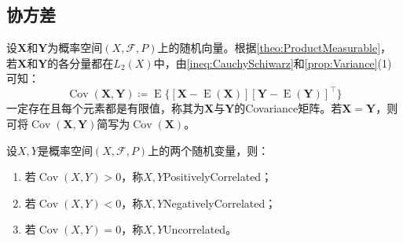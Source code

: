 \subsection{协方差}
\begin{definition}
	设$\mathbf{X}$和$\mathbf{Y}$为概率空间$(X,\mathscr{F},P)$上的随机向量。根据\cref{theo:ProductMeasurable}，若$\mathbf{X}$和$\mathbf{Y}$的各分量都在$L_2(X)$中，由\cref{ineq:CauchySchiwarz}和\cref{prop:Variance}(1)可知：
	\begin{equation*}
		\operatorname{Cov}(\mathbf{X},\mathbf{Y})\coloneq\operatorname{E}\{[\mathbf{X}-\operatorname{E}(\mathbf{X})][\mathbf{Y}-\operatorname{E}(\mathbf{Y})]^{\top}\}
	\end{equation*}
	一定存在且每个元素都是有限值，称其为$\mathbf{X}$与$\mathbf{Y}$的\gls{Covariance}矩阵。若$\mathbf{X}=\mathbf{Y}$，则可将$\operatorname{Cov}(\mathbf{X},\mathbf{Y})$简写为$\operatorname{Cov}(\mathbf{X})$。
\end{definition}
\begin{definition}
	设$X,Y$是概率空间$(X,\mathscr{F},P)$上的两个随机变量，则：
	\begin{enumerate}
		\item 若$\operatorname{Cov}(X,Y)>0$，称$X,Y$\gls{PositivelyCorrelated}；
		\item 若$\operatorname{Cov}(X,Y)<0$，称$X,Y$\gls{NegativelyCorrelated}；
		\item 若$\operatorname{Cov}(X,Y)=0$，称$X,Y$\gls{Uncorrelated}。
	\end{enumerate}
\end{definition}
